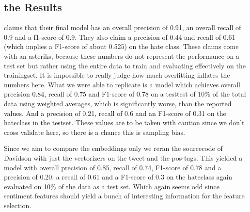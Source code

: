 \documentclass[11pt,a4paper]{article}
\begin{document}
\subsection{the Results}
\cite{auto_hatespeech} claims that their final model has an overall precision of 0.91, an overall recall of 0.9 and a f1-score of 0.9.
They also claim a precision of 0.44 and recall of 0.61 (which implies a F1-score of about 0.525) on the hate class.
These claims come with an asteriks, because these numbers do not represent the performance on a test set but rather using the entire
data to train and evaluating effectively on the trainingset. 
It is impossible to really judge how much overfitting inflates the numbers here.
What we were able to replicate is a model which achieves overall precision 0.84, recall of 0.75 and F1-score of 0.78 on a testtest of 10\% of the total data
using weighted averages, which is significantly worse, than the reported values.
And a precision of 0.21, recall of 0.6 and an F1-score of 0.31 on the hateclass in the testset.
These values are to be taken with caution since we don't cross validate here, so there is a chance this is sampling bias. 

\begin{table}
\caption{classification report for our reporduction of Davidsons model with features}

\end{table}

Since we aim to compare the embeddings only we reran the sourcecode of Davidson with just the vectorizers on the tweet and the pos-tags.
This yielded a model with overall precision of 0.85, recall of 0.74, F1-score of 0.78
and a precision of 0.20, a recall of 0.61 and a F1-score of 0.3 on the hateclass again evaluated on 10\% of the data as a test set.
Which again seems odd since sentiment features should yield a bunch of interesting information for the feature selection.
\end{document}
